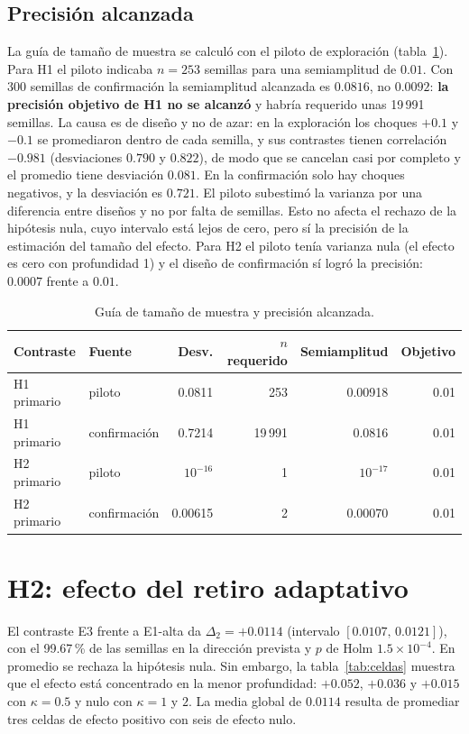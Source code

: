 \subsection{Precisión alcanzada}

La guía de tamaño de muestra se calculó con el piloto de exploración (tabla~\ref{tab:muestra}). Para H1 el piloto indicaba $n=253$ semillas para una semiamplitud de $0.01$. Con 300 semillas de confirmación la semiamplitud alcanzada es $0.0816$, no $0.0092$: \textbf{la precisión objetivo de H1 no se alcanzó} y habría requerido unas 19\,991 semillas. La causa es de diseño y no de azar: en la exploración los choques $+0.1$ y $-0.1$ se promediaron dentro de cada semilla, y sus contrastes tienen correlación $-0.981$ (desviaciones $0.790$ y $0.822$), de modo que se cancelan casi por completo y el promedio tiene desviación $0.081$. En la confirmación solo hay choques negativos, y la desviación es $0.721$. El piloto subestimó la varianza por una diferencia entre diseños y no por falta de semillas. Esto no afecta el rechazo de la hipótesis nula, cuyo intervalo está lejos de cero, pero sí la precisión de la estimación del tamaño del efecto. Para H2 el piloto tenía varianza nula (el efecto es cero con profundidad 1) y el diseño de confirmación sí logró la precisión: $0.0007$ frente a $0.01$.

\begin{table}[htbp]
\centering
\caption{Guía de tamaño de muestra y precisión alcanzada.}
\label{tab:muestra}
\small
\begin{tabular}{@{}llrrrr@{}}
\toprule
Contraste & Fuente & Desv. & $n$ requerido & Semiamplitud & Objetivo \\
\midrule
H1 primario & piloto & 0.0811 & 253 & 0.00918 & 0.01 \\
H1 primario & confirmación & 0.7214 & 19\,991 & 0.0816 & 0.01 \\
H2 primario & piloto & $10^{-16}$ & 1 & $10^{-17}$ & 0.01 \\
H2 primario & confirmación & 0.00615 & 2 & 0.00070 & 0.01 \\
\bottomrule
\end{tabular}
\end{table}

\section{H2: efecto del retiro adaptativo}
\label{sec:res-h2}

El contraste E3 frente a E1-alta da $\Delta_2=+0.0114$ (intervalo $[0.0107,\,0.0121]$), con el 99.67\,\% de las semillas en la dirección prevista y $p$ de Holm $1.5\times10^{-4}$. En promedio se rechaza la hipótesis nula. Sin embargo, la tabla~\ref{tab:celdas} muestra que el efecto está concentrado en la menor profundidad: $+0.052$, $+0.036$ y $+0.015$ con $\kappa=0.5$ y nulo con $\kappa=1$ y $2$. La media global de $0.0114$ resulta de promediar tres celdas de efecto positivo con seis de efecto nulo.

